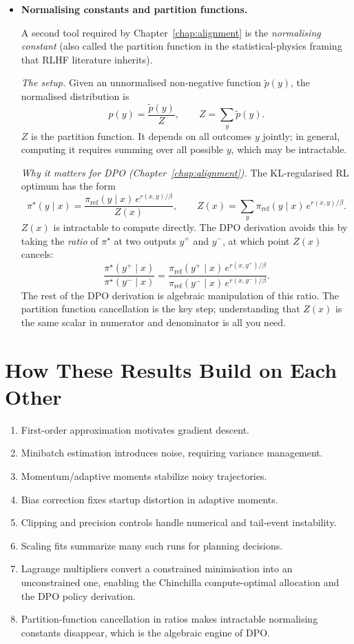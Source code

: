 \begin{itemize}[leftmargin=1.5em]
  \item \textbf{Normalising constants and partition functions.}

  A second tool required by Chapter~\ref{chap:alignment} is the \emph{normalising constant} (also called the partition function in the statistical-physics framing that RLHF literature inherits).

  \emph{The setup.} Given an unnormalised non-negative function $\tilde{p}(y)$, the normalised distribution is
  \[
    p(y) = \frac{\tilde{p}(y)}{Z}, \qquad Z = \sum_y \tilde{p}(y).
  \]
  $Z$ is the partition function. It depends on all outcomes $y$ jointly; in general, computing it requires summing over all possible $y$, which may be intractable.

  \emph{Why it matters for DPO (Chapter~\ref{chap:alignment}).}
  The KL-regularised RL optimum has the form
  \[
    \pi^\star(y \mid x) = \frac{\pi_{\mathrm{ref}}(y\mid x)\,e^{r(x,y)/\beta}}{Z(x)},
    \qquad Z(x) = \sum_y \pi_{\mathrm{ref}}(y\mid x)\,e^{r(x,y)/\beta}.
  \]
  $Z(x)$ is intractable to compute directly. The DPO derivation avoids this by taking the \emph{ratio} of $\pi^\star$ at two outputs $y^+$ and $y^-$, at which point $Z(x)$ cancels:
  \[
    \frac{\pi^\star(y^+\mid x)}{\pi^\star(y^-\mid x)}
    = \frac{\pi_{\mathrm{ref}}(y^+\mid x)\,e^{r(x,y^+)/\beta}}
           {\pi_{\mathrm{ref}}(y^-\mid x)\,e^{r(x,y^-)/\beta}}.
  \]
  The rest of the DPO derivation is algebraic manipulation of this ratio. The partition function cancellation is the key step; understanding that $Z(x)$ is the same scalar in numerator and denominator is all you need.
\end{itemize}

\section*{How These Results Build on Each Other}
\begin{enumerate}[leftmargin=1.5em]
  \item First-order approximation motivates gradient descent.
  \item Minibatch estimation introduces noise, requiring variance management.
  \item Momentum/adaptive moments stabilize noisy trajectories.
  \item Bias correction fixes startup distortion in adaptive moments.
  \item Clipping and precision controls handle numerical and tail-event instability.
  \item Scaling fits summarize many such runs for planning decisions.
  \item Lagrange multipliers convert a constrained minimisation into an unconstrained one, enabling the Chinchilla compute-optimal allocation and the DPO policy derivation.
  \item Partition-function cancellation in ratios makes intractable normalising constants disappear, which is the algebraic engine of DPO.
\end{enumerate}

